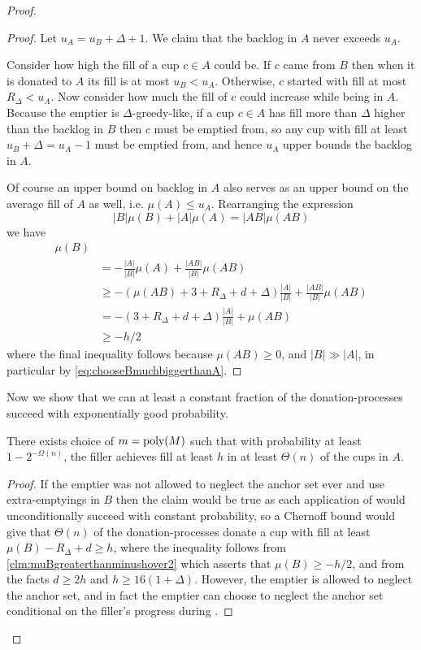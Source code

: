 \begin{proof}
\begin{proof}
  Let $u_A = u_B + \Delta + 1$. We claim that the backlog in $A$
  never exceeds $u_A$.

  Consider how high the fill of a cup $c \in A$ could be.
  If $c$ came from $B$ then when it is donated
  to $A$ its fill is at most $u_B < u_A$. Otherwise, $c$
  started with fill at most $R_\Delta < u_A$. Now consider how
  much the fill of $c$ could increase while being in $A$. Because
  the emptier is $\Delta$-greedy-like, if a cup $c\in A$ has fill
  more than $\Delta$ higher than the backlog in $B$ then $c$ must
  be emptied from, so any cup with fill at least $u_B + \Delta =
  u_A - 1$ must be emptied from, and hence $u_A$ upper bounds the
  backlog in $A$. 

  Of course an upper bound on backlog in $A$ also serves as
  an upper bound on the average fill of $A$ as well, i.e.
  $\mu(A) \le u_A$. 
  Rearranging the expression 
  $$|B|\mu(B) + |A|\mu(A) = |AB|\mu(AB)$$
  we have
  \begin{align*}
    \mu(B) &\\
           &= -\frac{|A|}{|B|} \mu(A) + \frac{|A B|}{|B|}\mu(A B) \\
           &\ge -(\mu(AB) + 3+R_\Delta+d+\Delta) \frac{|A|}{|B|} + \frac{|AB|}{|B|}\mu(AB)\\
           &= -(3+R_\Delta+d + \Delta) \frac{|A|}{|B|} + \mu(AB)\\
           &\ge -h/2
  \end{align*}
  where the final inequality follows because $\mu(AB) \ge 0$, and
  $|B|\gg |A|$, in particular by \eqref{eq:chooseBmuchbiggerthanA}.

\end{proof}

Now we show that we can at least a constant fraction of the
donation-processes succeed with exponentially good probability.
\begin{clm}
  There exists choice of $m = \operatorname{\text{poly}}(M)$ such that with probability at least
  $1-2^{-\Omega(n)}$, the filler achieves fill at least $h$ in at
  least $\Theta(n)$ of the cups in $A$. 
\end{clm}
\begin{proof}
  If the emptier was not allowed to neglect the anchor set ever
  and use extra-emptyings in $B$ then the claim would be true as
  each application of \randalg would unconditionally succeed with
  constant probability, so a Chernoff bound would give that
  $\Theta(n)$ of the donation-processes donate a cup with fill at
  least $\mu(B) - R_\Delta + d \ge h$, where the inequality
  follows from \cref{clm:muBgreaterthanminushover2} which asserts
  that $\mu(B) \ge -h/2$, and from the facts $d\ge 2h$
  and $h \ge 16(1+\Delta)$.
  However, the emptier is allowed to neglect the anchor set, and
  in fact the emptier can choose to neglect the anchor set
  conditional on the filler's progress during \randalg. 


\end{proof}
\end{proof}
